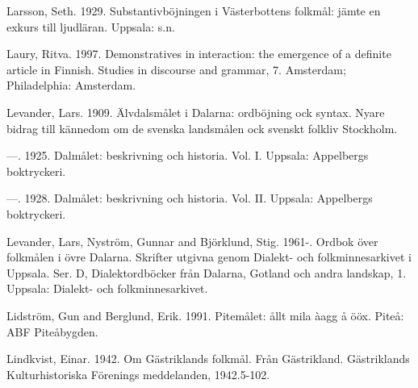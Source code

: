 \begin{styleBodytextC}
Larsson, Seth. 1929. Substantivböjningen i Västerbottens folkmål: jämte en exkurs till ljudläran. Uppsala: s.n.

\end{styleBodytextC}

\begin{styleBodytextC}
Laury, Ritva. 1997. Demonstratives in interaction: the emergence of a definite article in Finnish. Studies in discourse and grammar, 7. Amsterdam; Philadelphia: Amsterdam.

\end{styleBodytextC}

\begin{styleBodytextC}
Levander, Lars. 1909. Älvdalsmålet i Dalarna: ordböjning ock syntax. Nyare bidrag till kännedom om de svenska landsmålen ock svenskt folkliv Stockholm.

\end{styleBodytextC}

\begin{styleBodytextC}
—. 1925. Dalmålet: beskrivning och historia. Vol. I. Uppsala: Appelbergs boktryckeri.

\end{styleBodytextC}

\begin{styleBodytextC}
—. 1928. Dalmålet: beskrivning och historia. Vol. II. Uppsala: Appelbergs boktryckeri.

\end{styleBodytextC}

\begin{styleBodytextC}
Levander, Lars, Nyström, Gunnar and Björklund, Stig. 1961-. Ordbok över folkmålen i övre Dalarna. Skrifter utgivna genom Dialekt- och folkminnesarkivet i Uppsala. Ser. D, Dialektordböcker från Dalarna, Gotland och andra landskap, 1. Uppsala: Dialekt- och folkminnesarkivet.

\end{styleBodytextC}

\begin{styleBodytextC}
Lidström, Gun and Berglund, Erik. 1991. Pitemålet: ållt mila àagg å ööx. Piteå: ABF Piteåbygden.

\end{styleBodytextC}

\begin{styleBodytextC}
Lindkvist, Einar. 1942. Om Gästriklands folkmål. Från Gästrikland. Gästriklands Kulturhistoriska Förenings meddelanden, 1942.5-102.

\end{styleBodytextC}

